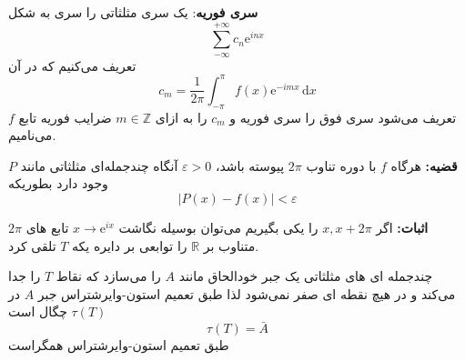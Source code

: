 \documentclass[12pt]{report}
\begin{document}
   \textbf{سری فوریه}:
   یک سری مثلثاتی را سری به شکل 
   $$\sum_{-\infty}^{+\infty} c_n \mathrm{e}^{inx}$$
   تعریف می‌کنیم که در آن
   \[
   c_m = \frac{1}{2\pi} \int_{-\pi}^{\pi} f(x)\mathrm{e}^{-imx} \, \mathrm{d}x
   \]
   تعریف می‌شود سری فوق را سری فوریه و 
   $c_m$
   را به ازای 
   $m \in \mathbb{Z}$
   ضرایب فوریه تابع 
   $f$
   می‌نامیم.
   \
   
   \textbf{قضیه:}
   هرگاه 
   $f$
   با دوره تناوب 
   $2\pi$
   پیوسته باشد، 
   $\varepsilon >0$
   آنگاه چندجمله‌ای مثلثاتی مانند 
   $P$
   وجود دارد بطوریکه 
   $$|P(x) - f(x)| < \varepsilon$$
   
   \textbf{اثبات:}
   اگر 
   $x , x + 2\pi$
   را یکی بگیریم می‌توان بوسیله نگاشت
   $ x \rightarrow \mathrm{e}^{ix}$
   تابع های 
   $2\pi$
   متناوب بر 
   $\mathbb{R}$
   را توابعی بر دایره یکه 
   $T$
   تلقی کرد.
   
   چندجمله ای های مثلثاتی یک جبر خودالحاق مانند 
   $A$
   را می‌سازد که نقاط 
   $T$
   را جدا می‌کند و در هیچ نقطه ای صفر نمی‌شود لذا طبق تعمیم استون-وایرشتراس جبر 
   $A$
   در
   $\tau(T)$
   چگال است 
   $$\tau(T) = \bar A$$
   طبق تعمیم استون-وایرشتراس همگراست
   
   
   
   
   
   
  



 
\end{document}
